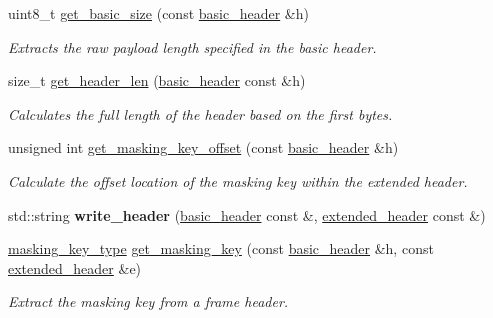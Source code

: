 \begin{DoxyCompactItemize}
uint8\+\_\+t \mbox{\hyperlink{namespacewebsocketpp_1_1frame_a2ceb63e6a2fe19964d13363ba2bb9e15}{get\+\_\+basic\+\_\+size}} (const \mbox{\hyperlink{structwebsocketpp_1_1frame_1_1basic__header}{basic\+\_\+header}} \&h)
\begin{DoxyCompactList}\small\item\em Extracts the raw payload length specified in the basic header. \end{DoxyCompactList}\item 
size\+\_\+t \mbox{\hyperlink{namespacewebsocketpp_1_1frame_abd4f23c906cc48fb3b34603fd4284b01}{get\+\_\+header\+\_\+len}} (\mbox{\hyperlink{structwebsocketpp_1_1frame_1_1basic__header}{basic\+\_\+header}} const \&h)
\begin{DoxyCompactList}\small\item\em Calculates the full length of the header based on the first bytes. \end{DoxyCompactList}\item 
unsigned int \mbox{\hyperlink{namespacewebsocketpp_1_1frame_a001d6c5e538d5eb1ef5ddc21aeb61ee3}{get\+\_\+masking\+\_\+key\+\_\+offset}} (const \mbox{\hyperlink{structwebsocketpp_1_1frame_1_1basic__header}{basic\+\_\+header}} \&h)
\begin{DoxyCompactList}\small\item\em Calculate the offset location of the masking key within the extended header. \end{DoxyCompactList}\item 
\mbox{\label{namespacewebsocketpp_1_1frame_a510f505f5208e9f3a06e32e50b9b4e89}} 
std\+::string {\bfseries write\+\_\+header} (\mbox{\hyperlink{structwebsocketpp_1_1frame_1_1basic__header}{basic\+\_\+header}} const \&, \mbox{\hyperlink{structwebsocketpp_1_1frame_1_1extended__header}{extended\+\_\+header}} const \&)
\item 
\mbox{\hyperlink{unionwebsocketpp_1_1frame_1_1uint32__converter}{masking\+\_\+key\+\_\+type}} \mbox{\hyperlink{namespacewebsocketpp_1_1frame_aed7edd146ce3aa5b87adc9fcc5fcb10f}{get\+\_\+masking\+\_\+key}} (const \mbox{\hyperlink{structwebsocketpp_1_1frame_1_1basic__header}{basic\+\_\+header}} \&h, const \mbox{\hyperlink{structwebsocketpp_1_1frame_1_1extended__header}{extended\+\_\+header}} \&e)
\begin{DoxyCompactList}\small\item\em Extract the masking key from a frame header. \end{DoxyCompactList}\item 

\end{DoxyCompactItemize}
